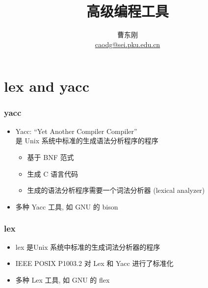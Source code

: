 \documentclass[compress]{beamer}
\begin{document}
					
\title{高级编程工具}

\author[\href{http://c.pku.edu.cn/}{http://c.pku.edu.cn/}]
{曹东刚\\\href{mailto:caodg@sei.pku.edu.cn}{caodg@sei.pku.edu.cn}}


\date{}


\begin{frame}
	\titlepage
\end{frame}

\section{lex and yacc}

\begin{frame}
\frametitle{yacc}
\begin{itemize}
\item \alert{Yacc}: ``Yet Another Compiler Compiler''\\
是 Unix 系统中标准的生成语法分析程序的程序

    \begin{itemize}
    \item 基于 BNF 范式
    \item 生成 C 语言代码
    \item 生成的语法分析程序需要一个词法分析器 (lexical analyzer)
    \end{itemize}
\item 多种 \alert{Yacc} 工具, 如 GNU 的 \alert{bison}
\end{itemize}


\end{frame}

\begin{frame}
  \frametitle{lex}

\begin{itemize}
\item \alert{lex} 是Unix 系统中标准的生成词法分析器的程序
\item IEEE POSIX P1003.2 对 \alert{Lex} 和 \alert{Yacc} 进行了标准化
\item 多种 \alert{Lex} 工具, 如 GNU 的 \alert{flex}
\end{itemize}

\end{frame}
\end{document}
